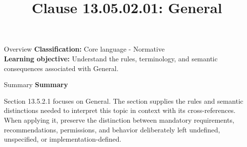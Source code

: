 \documentclass[10pt,letterpaper]{article}
\title{Clause 13.05.02.01: General}
\author{}
\date{}
\begin{document}
\maketitle
\begin{CornellOverviewBox}{Overview}
\textbf{Classification:} Core language - Normative\\[2pt]
\textbf{Learning objective:} Understand the rules, terminology, and semantic consequences associated with General.
\end{CornellOverviewBox}\begin{CornellSummaryBox}{Summary}
{\sffamily\bfseries\color{Accent} Summary}\par\vspace{3pt}Section 13.5.2.1 focuses on General. The section supplies the rules and semantic distinctions needed to interpret this topic in context with its cross-references. When applying it, preserve the distinction between mandatory requirements, recommendations, permissions, and behavior deliberately left undefined, unspecified, or implementation-defined.
\end{CornellSummaryBox}
\end{document}
